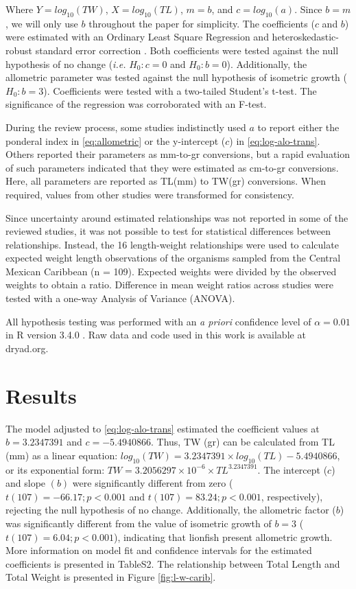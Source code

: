 \documentclass[fleqn,10pt,lineno]{wlpeerj} %
\begin{document}
Where \(Y = log_{10}(TW)\), \(X = log_{10}(TL)\), \(m = b\), and
\(c = log_{10}(a)\). Since \(b = m\), we will only use \(b\) throughout
the paper for simplicity. The coefficients (\(c\) and \(b\)) were
estimated with an Ordinary Least Square Regression and
heteroskedastic-robust standard error correction \citep{zeileis_2004}.
Both coefficients were tested against the null hypothesis of no change
(\emph{i.e.} \(H_0: c = 0\) and \(H_0: b = 0\)). Additionally, the
allometric parameter was tested against the null hypothesis of isometric
growth (\(H_0: b = 3\)). Coefficients were tested with a two-tailed
Student's t-test. The significance of the regression was corroborated
with an F-test.

During the review process, some studies indistinctly used \(a\) to
report either the ponderal index in \ref{eq:allometric} or the
y-intercept (\(c\)) in \ref{eq:log-alo-trans}. Others reported their
parameters as mm-to-gr conversions, but a rapid evaluation of such
parameters indicated that they were estimated as cm-to-gr conversions.
Here, all parameters are reported as TL(mm) to TW(gr) conversions. When
required, values from other studies were transformed for consistency.

Since uncertainty around estimated relationships was not reported in
some of the reviewed studies, it was not possible to test for
statistical differences between relationships. Instead, the 16
length-weight relationships were used to calculate expected weight
length observations of the organisms sampled from the Central Mexican
Caribbean (n = 109). Expected weights were divided by the observed
weights to obtain a ratio. Difference in mean weight ratios across
studies were tested with a one-way Analysis of Variance (ANOVA).

All hypothesis testing was performed with an \emph{a priori} confidence
level of \(\alpha = 0.01\) in R version 3.4.0 \citep{rcore_2017}. Raw
data and code used in this work is available at dryad.org.

\section{Results}\label{results}

The model adjusted to \ref{eq:log-alo-trans} estimated the coefficient
values at \(b = 3.2347391\) and \(c = -5.4940866\). Thus, TW (gr) can be
calculated from TL (mm) as a linear equation:
\(log_{10}(TW) = 3.2347391\times log_{10}(TL) -5.4940866\), or its
exponential form: \(TW = 3.2056297\times 10^{-6}\times TL^{3.2347391}\).
The intercept (\(c\)) and slope \((b)\) were significantly different
from zero (\(t(107) = -66.17; p<0.001\) and \(t(107) = 83.24; p<0.001\),
respectively), rejecting the null hypothesis of no change. Additionally,
the allometric factor (\(b\)) was significantly different from the value
of isometric growth of \(b = 3\) (\(t(107) = 6.04; p<0.001\)),
indicating that lionfish present allometric growth. More information on
model fit and confidence intervals for the estimated coefficients is
presented in TableS2. The relationship between Total Length and Total
Weight is presented in Figure \ref{fig:l-w-carib}.
\end{document}
